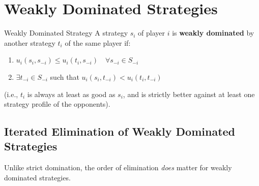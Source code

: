 \documentclass[12pt, a4paper]{article}
\begin{document}
\section{Weakly Dominated Strategies}

\begin{defbox}{Weakly Dominated Strategy}
  A strategy $s_i$ of player $i$ is \textbf{weakly dominated} by another strategy $t_i$ of the same player if:
  \begin{enumerate}
      \item $u_i(s_i, s_{-i}) \leq u_i(t_i, s_{-i}) \quad \forall s_{-i} \in S_{-i}$
      \item $\exists t_{-i} \in S_{-i}$ such that $u_i(s_i, t_{-i}) < u_i(t_i, t_{-i})$
  \end{enumerate}
  (i.e., $t_i$ is always at least as good as $s_i$, and is strictly better against at least one strategy profile of the opponents).
\end{defbox}

\subsection{Iterated Elimination of Weakly Dominated Strategies}

Unlike strict domination, the order of elimination \emph{does} matter for weakly dominated strategies. 
\end{document}
